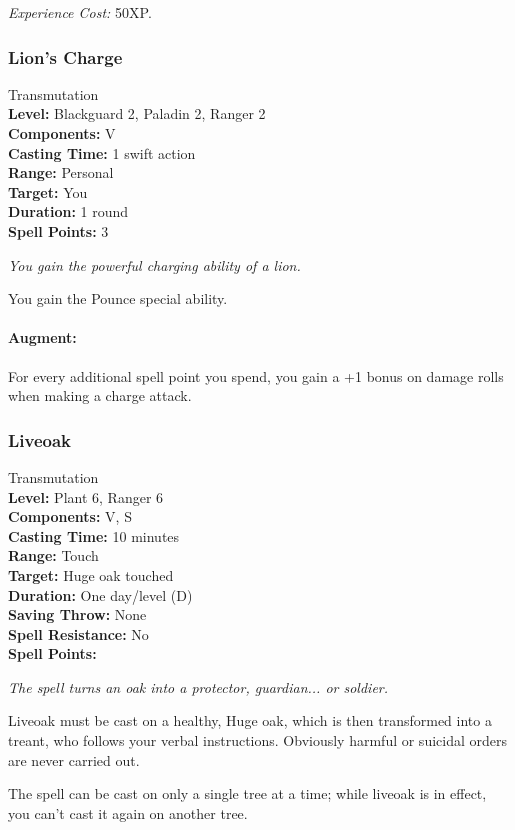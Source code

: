 \emph{Experience Cost:} 50XP.
\subsubsection{Lion's Charge} 
\label{Spell:LionsCharge}
Transmutation
\\ \textbf{Level:} Blackguard 2, Paladin 2, Ranger 2
\\ \textbf{Components:} V
\\ \textbf{Casting Time:} 1 swift action
\\ \textbf{Range:} Personal
\\ \textbf{Target:} You
\\ \textbf{Duration:} 1 round
\\ \textbf{Spell Points:} 3

\emph{You gain the powerful charging ability of a lion.} 

You gain the Pounce special ability.

\paragraph{Augment:}
For every additional spell point you spend, you gain a +1 bonus on damage rolls when making a charge attack.
\subsubsection{Liveoak}
\label{Spell:Liveoak}
Transmutation
\\ \textbf{Level:} Plant 6, Ranger 6
\\ \textbf{Components:} V, S
\\ \textbf{Casting Time:} 10 minutes
\\ \textbf{Range:} Touch
\\ \textbf{Target:} Huge oak touched
\\ \textbf{Duration:} One day/level (D)
\\ \textbf{Saving Throw:} None
\\ \textbf{Spell Resistance:} No
\\ \textbf{Spell Points:}

\emph{The spell turns an oak into a protector, guardian... or soldier.}

Liveoak must be cast on a healthy, Huge oak, which is then transformed into a treant, who follows your verbal instructions. Obviously harmful or suicidal orders are never carried out.

The spell can be cast on only a single tree at a time; while liveoak is in effect, you can't cast it again on another tree. 


